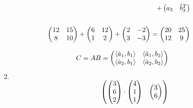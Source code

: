 \documentclass[12pt]{article}
\begin{document}
\begin{enumerate}
\begin{enumerate}
\begin{align*}
            + \begin{pmatrix}
                a_3 & \Tilde{b}_3^T
            \end{pmatrix} && \\ && \\
            \begin{pmatrix}
                12 & 15 \\
                8 & 10
            \end{pmatrix}
            + \begin{pmatrix}
                6 & 12 \\
                1 & 2
            \end{pmatrix}
            + \begin{pmatrix}
                2 & -2 \\
                3 & -3
            \end{pmatrix}
            = \begin{pmatrix}
                20 & 25 \\
                12 & 9
            \end{pmatrix}
        \end{align*}
        \item 
        \begin{align*}
            C = AB = 
            \begin{pmatrix}
                \langle \Tilde{a}_1, b_1 \rangle & \langle \Tilde{a}_1, b_2 \rangle \\
                \langle \Tilde{a}_2, b_1 \rangle & \langle \Tilde{a}_2, b_2 \rangle
            \end{pmatrix} \\ \\
            \begin{pmatrix}
                \begin{pmatrix}
                    3 \\
                    6 \\
                    2
                \end{pmatrix} \cdot
                \begin{pmatrix}
                    4 \\
                    1 \\
                    1
                \end{pmatrix} &
                \begin{pmatrix}
                    3 \\
                    6 \\

\end{pmatrix}
\end{pmatrix}
\end{align*}
\end{enumerate}
\end{enumerate}
\end{document}
